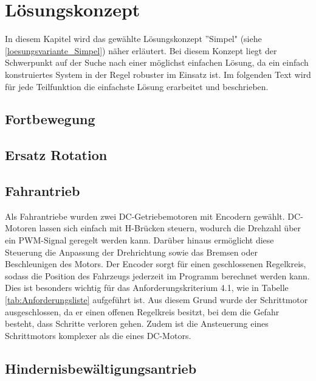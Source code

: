 \documentclass[../main.tex]{subfiles}
\begin{document}
\newpage
\section{Lösungskonzept}

In diesem Kapitel wird das gewählte Lösungskonzept ''Simpel" (siehe \ref{loesungsvariante_Simpel}) näher erläutert. Bei diesem Konzept liegt der Schwerpunkt auf der Suche nach einer möglichst einfachen Lösung, da ein einfach konstruiertes System in der Regel robuster im Einsatz ist. Im folgenden Text wird für jede Teilfunktion die einfachste Lösung erarbeitet und beschrieben.

\subsection{Fortbewegung}



\subsection{Ersatz Rotation}    %



\subsection{Fahrantrieb}
Als Fahrantriebe wurden zwei DC-Getriebemotoren mit Encodern gewählt. DC-Motoren lassen sich einfach mit H-Brücken steuern, wodurch die Drehzahl über ein PWM-Signal geregelt werden kann. Darüber hinaus ermöglicht diese Steuerung die Anpassung der Drehrichtung sowie das Bremsen oder Beschleunigen des Motors. Der Encoder sorgt für einen geschlossenen Regelkreis, sodass die Position des Fahrzeugs jederzeit im Programm berechnet werden kann. Dies ist besonders wichtig für das Anforderungskriterium 4.1, wie in Tabelle \ref{tab:Anforderungsliste} aufgeführt ist. Aus diesem Grund wurde der Schrittmotor ausgeschlossen, da er einen offenen Regelkreis besitzt, bei dem die Gefahr besteht, dass Schritte verloren gehen. Zudem ist die Ansteuerung eines Schrittmotors komplexer als die eines DC-Motors.


\subsection{Hindernisbewältigungsantrieb}
\end{document}
